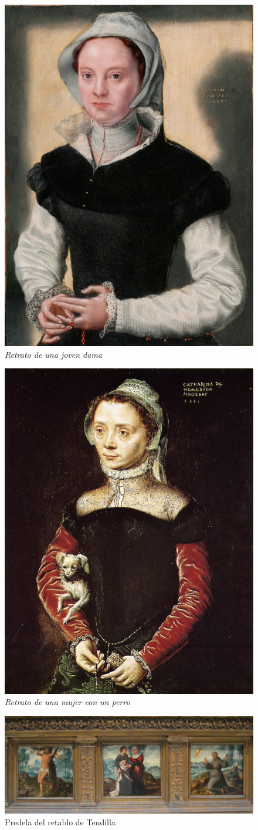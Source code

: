 \documentclass[12pt]{report}
\begin{document}
\begin{figure}[h]
	\centering
	\includegraphics[width=0.4\linewidth]{portrait-of-a-young-lady}
	\caption{\textit{Retrato de una joven dama}}
\end{figure}

\begin{figure}[h]
	\centering
	\includegraphics[width=0.4\linewidth]{portrait-of-a-woman-with-a-dog}
	\caption{\textit{Retrato de una mujer con un perro}}
\end{figure}

\begin{figure}[h]
	\centering
	\includegraphics[width=0.8\linewidth]{predella-tendilla-retablo}
	\caption{Predela del retablo de Tendilla}
\end{figure}
\end{document}

